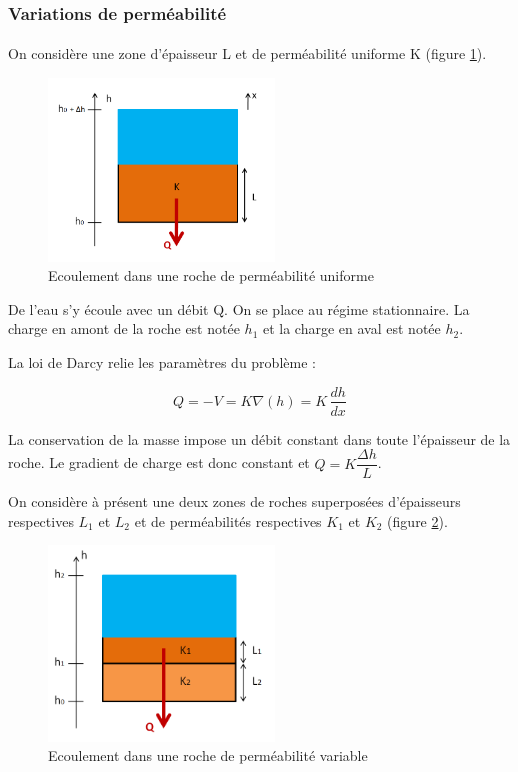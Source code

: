 \documentclass{article}
\begin{document}
\subsubsection{Variations de perméabilité}
\paragraph{} On considère une zone d’épaisseur L et de perméabilité uniforme K (figure \ref{fig:ecoulement_permea_uniforme}).

\begin{figure}[H]
    \centering
    \includegraphics[width=6cm]{A_III_B_1.png}
    \caption{Ecoulement dans une roche de perméabilité uniforme}
    \label{fig:ecoulement_permea_uniforme}
\end{figure}
De l’eau s’y écoule avec un débit Q. On se place au régime stationnaire. La charge en amont de la roche est notée $h_1$ et la charge en aval est notée $h_2$.

La loi de Darcy relie les paramètres du problème :

$$ Q = -V = K\nabla(h) = K\,\frac{dh}{dx} $$


La conservation de la masse impose un débit constant dans toute l’épaisseur de la roche. Le gradient de charge est donc constant et  $Q = K\dfrac{\Delta h}{L} $.

On considère à présent une deux zones de roches superposées d’épaisseurs respectives $L_1$ et $L_2$ et de perméabilités respectives $K_1$ et $K_2$ (figure \ref{fig:ecoulement_permea_variable}).

\begin{figure}[H]
    \centering
    \includegraphics[width=6cm]{A_III_B_2.png}
    \caption{Ecoulement dans une roche de perméabilité variable}
    \label{fig:ecoulement_permea_variable}
\end{figure}
\end{document}

